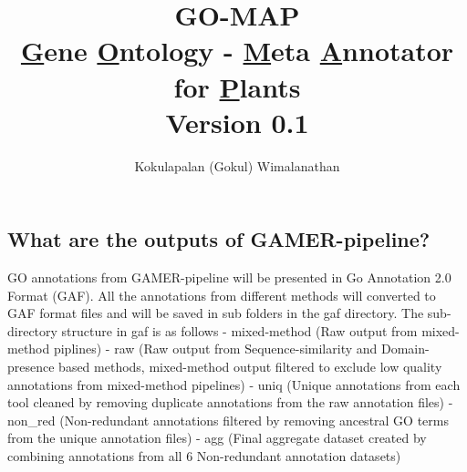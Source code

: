 \documentclass[11pt,letterpaper]{article}
\title{
  \textbf{GO-MAP} \\
  \Large{ \underline{G}ene \underline{O}ntology - \underline{M}eta \underline{A}nnotator for \underline{P}lants} \\
  \large {Version 0.1}
}
\author{Kokulapalan (Gokul) Wimalanathan}
\begin{document}

\maketitle
\newpage










\subsection{What are the outputs of
 GAMER-pipeline?}\label{what-are-the-outputs-of-gamer-pipeline}

GO annotations from GAMER-pipeline will be presented in Go Annotation
2.0 Format (GAF). All the annotations from different methods will
converted to GAF format files and will be saved in sub folders in the
gaf directory. The sub-directory structure in gaf is as follows -
mixed-method (Raw output from mixed-method piplines) - raw (Raw output
from Sequence-similarity and Domain-presence based methods, mixed-method
output filtered to exclude low quality annotations from mixed-method
pipelines) - uniq (Unique annotations from each tool cleaned by removing
duplicate annotations from the raw annotation files) - non\_red
(Non-redundant annotations filtered by removing ancestral GO terms from
the unique annotation files) - agg (Final aggregate dataset created by
combining annotations from all 6 Non-redundant annotation datasets)
\end{document}
